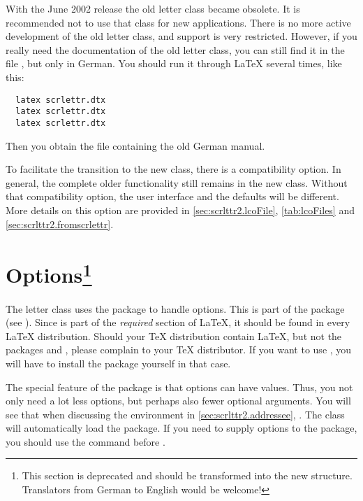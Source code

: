 With the June 2002 release the old letter class
 became obsolete. It is
recommended not to use that class for new applications. There is no
more active development of the old letter class, and support is very
restricted. However, if you really need the documentation of the old
letter class, you can still find it in the file ,
but only in German. You should run it through {\LaTeX} several times,
like this:
\begin{lstlisting}
  latex scrlettr.dtx
  latex scrlettr.dtx
  latex scrlettr.dtx
\end{lstlisting}
Then you obtain the file  containing the old German
manual.

To facilitate the transition to the new class, there is a
compatibility option. In general, the complete older functionality
still remains in the new class.  Without that compatibility option,
the user interface and the defaults will be different. More details on
this option are provided in \autoref{sec:scrlttr2.lcoFile},
\autoref{tab:lcoFiles} and \autoref{sec:scrlttr2.fromscrlettr}.


\section{Options\protect\footnote{This section is
  deprecated and should be transformed into the new structure. Translators
  from German to English would be welcome!}}
\label{sec:scrlttr2.options}

The letter class  uses the package
 to handle options. This is part
of the  package (see \cite{package:graphics}). Since
 is part of the \emph{required} section of {\LaTeX},
it should be found in every {\LaTeX} distribution. Should your {\TeX}
distribution contain {\LaTeX}, but not the packages 
and , please complain to your {\TeX} distributor. If
you want to use , you will have to install the
 package yourself in that case.

\begin{Explain}
  The special feature of the  package is that options
  can have values. Thus, you not only need a lot less options, but
  perhaps also fewer optional arguments. You will see that when
  discussing the  environment in
  \autoref{sec:scrlttr2.addressee},
  . The class will
  automatically load the  package. If you need to
  supply options to the  package, you should use the
   command before .
\end{Explain}

